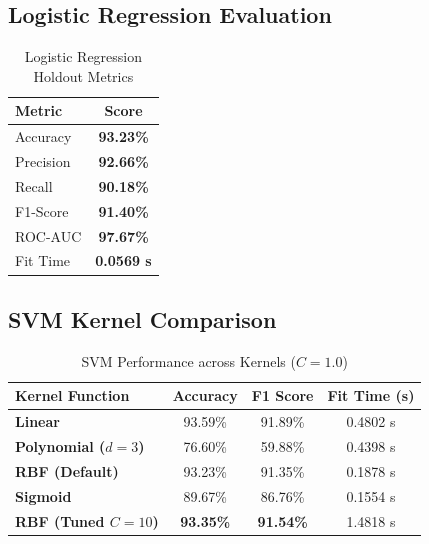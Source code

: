 \documentclass[12pt,a4paper]{article}
\begin{document}
\subsection{Logistic Regression Evaluation}
\begin{table}[H]
\centering
\caption{Logistic Regression Holdout Metrics}
\label{tab:lr_metrics}
\begin{tabular}{lc}
\toprule
\textbf{Metric} & \textbf{Score} \\
\midrule
Accuracy & \textbf{93.23\%} \\
Precision & \textbf{92.66\%} \\
Recall & \textbf{90.18\%} \\
F1-Score & \textbf{91.40\%} \\
ROC-AUC & \textbf{97.67\%} \\
Fit Time & \textbf{0.0569 s} \\
\bottomrule
\end{tabular}
\end{table}

\subsection{SVM Kernel Comparison}
\begin{table}[H]
\centering
\caption{SVM Performance across Kernels ($C=1.0$)}
\label{tab:svm_kernel_comp}
\begin{tabular}{|p{3cm}|c|c|c|}
\hline
\textbf{Kernel Function} & \textbf{Accuracy} & \textbf{F1 Score} & \textbf{Fit Time (s)} \\ \hline
\textbf{Linear} & 93.59\% & 91.89\% & 0.4802 s \\ \hline
\textbf{Polynomial ($d=3$)} & 76.60\% & 59.88\% & 0.4398 s \\ \hline
\textbf{RBF (Default)} & 93.23\% & 91.35\% & 0.1878 s \\ \hline
\textbf{Sigmoid} & 89.67\% & 86.76\% & 0.1554 s \\ \hline
\textbf{RBF (Tuned $C=10$)} & \textbf{93.35\%} & \textbf{91.54\%} & 1.4818 s \\ \hline
\end{tabular}
\end{table}
\end{document}
